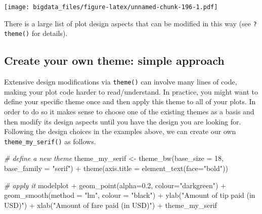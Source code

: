 \documentclass[
  12pt,
]{style/krantz}
\newenvironment{Shaded}{\begin{snugshade}}{\end{snugshade}}
\newcommand{\AttributeTok}[1]{\textcolor[rgb]{0.77,0.63,0.00}{#1}}
\newcommand{\CommentTok}[1]{\textcolor[rgb]{0.56,0.35,0.01}{\textit{#1}}}
\newcommand{\DecValTok}[1]{\textcolor[rgb]{0.00,0.00,0.81}{#1}}
\newcommand{\FloatTok}[1]{\textcolor[rgb]{0.00,0.00,0.81}{#1}}
\newcommand{\FunctionTok}[1]{\textcolor[rgb]{0.00,0.00,0.00}{#1}}
\newcommand{\NormalTok}[1]{#1}
\newcommand{\OtherTok}[1]{\textcolor[rgb]{0.56,0.35,0.01}{#1}}
\newcommand{\SpecialCharTok}[1]{\textcolor[rgb]{0.00,0.00,0.00}{#1}}
\newcommand{\StringTok}[1]{\textcolor[rgb]{0.31,0.60,0.02}{#1}}
\begin{document}
\texttt{[image: bigdata\_files/figure-latex/unnamed-chunk-196-1.pdf]}

There is a large list of plot design aspects that can be modified in this way (see \texttt{?theme()} for details).

\hypertarget{create-your-own-theme-simple-approach}{%
\subsection{Create your own theme: simple approach}\label{create-your-own-theme-simple-approach}}

Extensive design modifications via \texttt{theme()} can involve many lines of code, making your plot code harder to read/understand. In practice, you might want to define your specific theme once and then apply this theme to all of your plots. In order to do so it makes sense to choose one of the existing themes as a basis and then modify its design aspects until you have the design you are looking for. Following the design choices in the examples above, we can create our own \texttt{theme\_my\_serif()} as follows.

\begin{Shaded}
\begin{Highlighting}[]
\CommentTok{\# \textquotesingle{}define\textquotesingle{} a new theme}
\NormalTok{theme\_my\_serif }\OtherTok{\textless{}{-}}      
  \FunctionTok{theme\_bw}\NormalTok{(}\AttributeTok{base\_size =} \DecValTok{18}\NormalTok{, }\AttributeTok{base\_family =} \StringTok{"serif"}\NormalTok{) }\SpecialCharTok{+}
  \FunctionTok{theme}\NormalTok{(}\AttributeTok{axis.title =} \FunctionTok{element\_text}\NormalTok{(}\AttributeTok{face=}\StringTok{"bold"}\NormalTok{))}

\CommentTok{\# apply it }
\NormalTok{modelplot }\SpecialCharTok{+}
     \FunctionTok{geom\_point}\NormalTok{(}\AttributeTok{alpha=}\FloatTok{0.2}\NormalTok{, }\AttributeTok{colour=}\StringTok{"darkgreen"}\NormalTok{) }\SpecialCharTok{+}
     \FunctionTok{geom\_smooth}\NormalTok{(}\AttributeTok{method =} \StringTok{"lm"}\NormalTok{, }\AttributeTok{colour =} \StringTok{"black"}\NormalTok{) }\SpecialCharTok{+}
     \FunctionTok{ylab}\NormalTok{(}\StringTok{"Amount of tip paid (in USD)"}\NormalTok{) }\SpecialCharTok{+}
     \FunctionTok{xlab}\NormalTok{(}\StringTok{"Amount of fare paid (in USD)"}\NormalTok{) }\SpecialCharTok{+}
\NormalTok{  theme\_my\_serif}
\end{Highlighting}
\end{Shaded}
\end{document}
